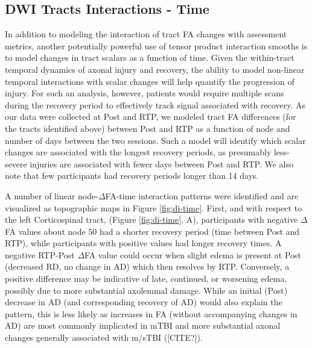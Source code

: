 \documentclass[12pt]{article}
\begin{document}
\subsection{DWI Tracts Interactions - Time}
\label{ssec:res-dwi-time}
In addition to modeling the interaction of tract FA changes with assessment metrics, another potentially powerful use of tensor product interaction smooths is to model changes in tract scalars as a function of time. Given the within-tract temporal dynamics of axonal injury and recovery, the ability to model non-linear temporal interactions with scalar changes will help quantify the progression of injury. For such an analysis, however, patients would require multiple scans during the recovery period to effectively track signal associated with recovery. As our data were collected at Post and RTP, we modeled tract FA differences (for the tracts identified above) between Post and RTP as a function of node and number of days between the two sessions. Such a model will identify which scalar changes are associated with the longest recovery periods, as presumably less-severe injuries are associated with fewer days between Post and RTP. We also note that few participants had recovery periods longer than 14 days.

A number of linear node-$\Delta$FA-time interaction patterns were identified and are visualized as topographic maps in Figure \ref{fig:di-time}. First, and with respect to the left Corticospinal tract, (Figure \ref{fig:di-time}, A), participants with negative $\Delta$FA values about node 50 had a shorter recovery period (time between Post and RTP), while participants with positive values had longer recovery times. A negative RTP-Post $\Delta$FA value could occur when slight edema is present at Post (decreased RD, no change in AD) which then resolves by RTP. Conversely, a positive difference may be indicative of late, continued, or worsening edema, possibly due to more substantial axolemmal damage. While an initial (Post) decrease in AD (and corresponding recovery of AD) would also explain the pattern, this is less likely as increases in FA (without accompanying changes in AD) are most commonly implicated in mTBI and more substantial axonal changes generally associated with m/sTBI ([CITE?]).
\end{document}
